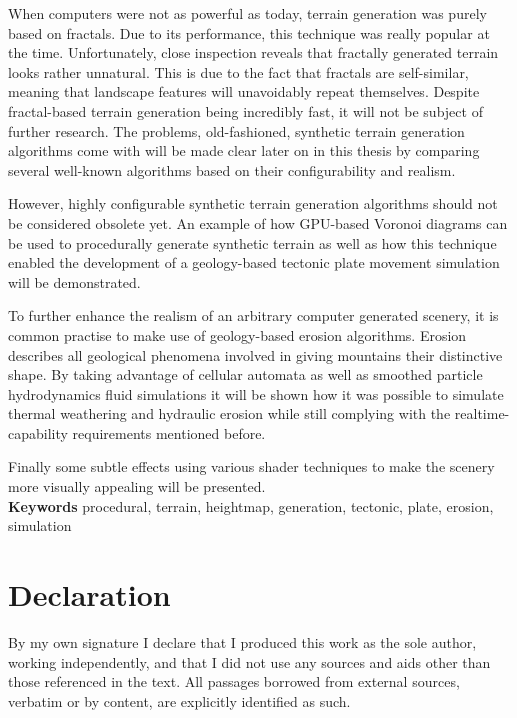 \documentclass[11pt,a4paper,twoside,openright]{report}
\begin{document}
When computers were not as powerful as today, terrain generation was purely based on fractals. Due to its performance, this technique was really popular at the time. Unfortunately, close inspection reveals that fractally generated terrain looks rather unnatural. This is due to the fact that fractals are self-similar, meaning that landscape features will unavoidably repeat themselves. Despite fractal-based terrain generation being incredibly fast, it will not be subject of further research. The problems, old-fashioned, synthetic terrain generation algorithms come with will be made clear later on in this thesis by comparing several well-known algorithms based on their configurability and realism.

However, highly configurable synthetic terrain generation algorithms should not be considered obsolete yet. An example of how GPU-based Voronoi diagrams can be used to procedurally generate synthetic terrain as well as how this technique enabled the development of a geology-based tectonic plate movement simulation will be demonstrated.

To further enhance the realism of an arbitrary computer generated scenery, it is common practise to make use of geology-based erosion algorithms. Erosion describes all geological phenomena involved in giving mountains their distinctive shape. By taking advantage of cellular automata as well as smoothed particle hydrodynamics fluid simulations it will be shown how it was possible to simulate thermal weathering and hydraulic erosion while still complying with the realtime-capability requirements mentioned before.

Finally some subtle effects using various shader techniques to make the scenery more visually appealing will be presented.
\medskip
\noindent \\\textbf{Keywords} procedural, terrain, heightmap, generation, tectonic, plate, erosion, simulation



\tableofcontents
\listoffigures
\listoftables


\chapter*{Declaration}
By my own signature I declare that I produced this work as the sole author, working independently,
and that I did not use any sources and aids other than those referenced in the text.
All passages borrowed from external sources, verbatim or by content, are explicitly identified as
such.\\
\end{document}
